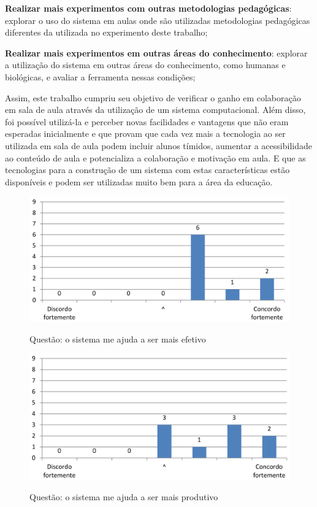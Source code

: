\textbf{Realizar mais experimentos com outras metodologias pedagógicas}: explorar o uso do sistema em aulas onde são utilizadas metodologias pedagógicas diferentes da utilizada no experimento deste trabalho;

\textbf{Realizar mais experimentos em outras áreas do conhecimento}: explorar a utilização do sistema em outras áreas do conhecimento, como humanas e biológicas, e avaliar a ferramenta nessas condições;

Assim, este trabalho cumpriu seu objetivo de verificar o ganho em colaboração em sala de aula através da utilização de um sistema computacional. Além disso, foi possível utilizá-la e perceber novas facilidades e vantagens que não eram esperadas inicialmente e que provam que cada vez mais a tecnologia ao ser utilizada em sala de aula podem incluir alunos tímidos, aumentar a acessibilidade ao conteúdo de aula e potencializa a colaboração e motivação em aula. E que as tecnologias para a construção de um sistema com estas características estão disponíveis e podem ser utilizadas muito bem para a área da educação.


\iffalse
\begin{figure}[ht]
\centering
\caption{Questão: o sistema me ajuda a ser mais efetivo}
\includegraphics[width=1.0\textwidth]{use/mais_efetivo.pdf} 
\label{fig:mais_efetivo} 
\end{figure}


\begin{figure}[ht]
\centering
\caption{Questão: o sistema me ajuda a ser mais produtivo}
\includegraphics[width=1.0\textwidth]{use/mais_produtivo.pdf} 
\label{fig:mais_produtivo} 
\end{figure}


